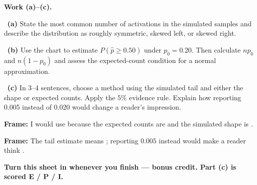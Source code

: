 \documentclass[11pt]{article}
\begin{document}
\newpage
\textbf{Work (a)--(c).}\par\smallskip

~\textbf{(a)} State the most common number of activations in the simulated samples and describe the distribution as roughly symmetric, skewed left, or skewed right.\par
\workspace{0.7in}

~\textbf{(b)} Use the chart to estimate $P(\hat p\ge0.50)$ under $p_0=0.20$. Then calculate $np_0$ and $n(1-p_0)$ and assess the expected-count condition for a normal approximation.\par
\workspace{1.4in}

~\textbf{(c)} In 3--4 sentences, choose a method using the simulated tail and either the shape or expected counts. Apply the $5\%$ evidence rule. Explain how reporting 0.005 instead of 0.020 would change a reader's impression.\par
\workspace{2.0in}

\begin{sentenceframebox}\raggedright\textbf{Frame:} I would use \blank[1.2in] because the expected counts are \blank[1.5in] and the simulated shape is \blank[1.4in].\end{sentenceframebox}

\begin{sentenceframebox}\raggedright\textbf{Frame:} The tail estimate \blank[0.8in] means \blank[2.3in]; reporting $0.005$ instead would make a reader think \blank[2.2in].\end{sentenceframebox}

\textbf{Turn this sheet in whenever you finish --- bonus credit. Part (c) is scored E / P / I.}\par
\end{document}
